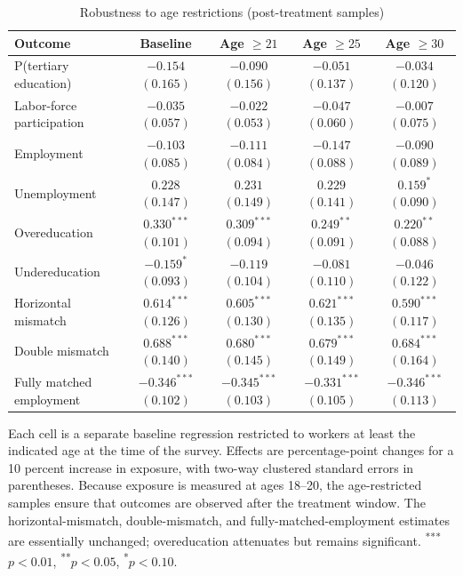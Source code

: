 \begin{table}[htbp]
  \centering
  \caption{Robustness to age restrictions (post-treatment samples)}
  \label{tab:appage}
  \begin{threeparttable}
  \begin{tabular}{L{4.8cm}cccc}
    \toprule
    Outcome & Baseline & Age $\geq 21$ & Age $\geq 25$ & Age $\geq 30$ \\
    \midrule
    P(tertiary education)     & $-0.154$ $(0.165)$ & $-0.090$ $(0.156)$ & $-0.051$ $(0.137)$ & $-0.034$ $(0.120)$ \\
    Labor-force participation & $-0.035$ $(0.057)$ & $-0.022$ $(0.053)$ & $-0.047$ $(0.060)$ & $-0.007$ $(0.075)$ \\
    Employment                & $-0.103$ $(0.085)$ & $-0.111$ $(0.084)$ & $-0.147$ $(0.088)$ & $-0.090$ $(0.089)$ \\
    Unemployment              & $0.228$ $(0.147)$  & $0.231$ $(0.149)$  & $0.229$ $(0.141)$  & $0.159^{*}$ $(0.090)$ \\
    Overeducation             & $0.330^{***}$ $(0.101)$ & $0.309^{***}$ $(0.094)$ & $0.249^{**}$ $(0.091)$ & $0.220^{**}$ $(0.088)$ \\
    Undereducation            & $-0.159^{*}$ $(0.093)$ & $-0.119$ $(0.104)$ & $-0.081$ $(0.110)$ & $-0.046$ $(0.122)$ \\
    Horizontal mismatch       & $0.614^{***}$ $(0.126)$ & $0.605^{***}$ $(0.130)$ & $0.621^{***}$ $(0.135)$ & $0.590^{***}$ $(0.117)$ \\
    Double mismatch           & $0.688^{***}$ $(0.140)$ & $0.680^{***}$ $(0.145)$ & $0.679^{***}$ $(0.149)$ & $0.684^{***}$ $(0.164)$ \\
    Fully matched employment  & $-0.346^{***}$ $(0.102)$ & $-0.345^{***}$ $(0.103)$ & $-0.331^{***}$ $(0.105)$ & $-0.346^{***}$ $(0.113)$ \\
    \bottomrule
  \end{tabular}
  \begin{tablenotes}[flushleft]
    \footnotesize
    \item Each cell is a separate baseline regression restricted to workers at least the indicated
    age at the time of the survey. Effects are percentage-point changes for a 10 percent increase
    in exposure, with two-way clustered standard errors in parentheses. Because exposure is
    measured at ages 18--20, the age-restricted samples ensure that outcomes are observed after
    the treatment window. The horizontal-mismatch, double-mismatch, and fully-matched-employment
    estimates are essentially unchanged; overeducation attenuates but remains significant.
    \textsuperscript{***}$p<0.01$, \textsuperscript{**}$p<0.05$, \textsuperscript{*}$p<0.10$.
  \end{tablenotes}
  \end{threeparttable}
\end{table}

